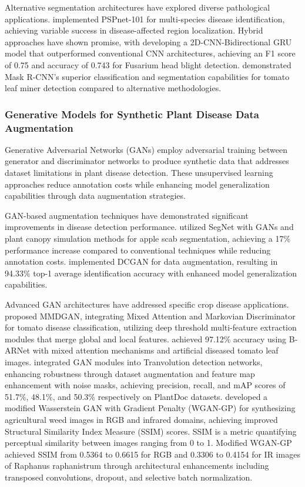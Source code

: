 \documentclass[sn-mathphys]{sn-jnl}
\theoremstyle{thmstyleone}%
\theoremstyle{thmstyletwo}%
\theoremstyle{thmstylethree}%
\begin{document}
Alternative segmentation architectures have explored diverse pathological applications. \citet{mzoughi2023deep} implemented PSPnet-101 for multi-species disease identification, achieving variable success in disease-affected region localization. Hybrid approaches have shown promise, with \citet{anwar2023nwrd} developing a 2D-CNN-Bidirectional GRU model that outperformed conventional CNN architectures, achieving an F1 score of 0.75 and accuracy of 0.743 for Fusarium head blight detection. \citet{jeong2022detection} demonstrated Mask R-CNN's superior classification and segmentation capabilities for tomato leaf miner detection compared to alternative methodologies.

\subsubsection{Generative Models for Synthetic Plant Disease Data Augmentation}

Generative Adversarial Networks (GANs) employ adversarial training between generator and discriminator networks to produce synthetic data that addresses dataset limitations in plant disease detection. These unsupervised learning approaches reduce annotation costs while enhancing model generalization capabilities through data augmentation strategies.

GAN-based augmentation techniques have demonstrated significant improvements in disease detection performance. \citet{douarre2019novel} utilized SegNet with GANs and plant canopy simulation methods for apple scab segmentation, achieving a 17\% performance increase compared to conventional techniques while reducing annotation costs. \citet{wu2020dcgan} implemented DCGAN for data augmentation, resulting in 94.33\% top-1 average identification accuracy with enhanced model generalization capabilities.

Advanced GAN architectures have addressed specific crop disease applications. \citet{zhang2022mmdgan} proposed MMDGAN, integrating Mixed Attention and Markovian Discriminator for tomato disease classification, utilizing deep threshold multi-feature extraction modules that merge global and local features. \citet{chen2020identification} achieved 97.12\% accuracy using B-ARNet with mixed attention mechanisms and artificial diseased tomato leaf images. \citet{zhang2022automatic} integrated GAN modules into Tranvolution detection networks, enhancing robustness through dataset augmentation and feature map enhancement with noise masks, achieving precision, recall, and mAP scores of 51.7\%, 48.1\%, and 50.3\% respectively on PlantDoc datasets. \citet{rana2025comparative} developed a modified Wasserstein GAN with Gradient Penalty (WGAN-GP) for synthesizing agricultural weed images in RGB and infrared domains, achieving improved Structural Similarity Index Measure (SSIM) scores. SSIM is a metric quantifying perceptual similarity between images ranging from 0 to 1. Modified WGAN-GP achieved SSIM from 0.5364 to 0.6615 for RGB and 0.3306 to 0.4154 for IR images of Raphanus raphanistrum through architectural enhancements including transposed convolutions, dropout, and selective batch normalization.
\end{document}
